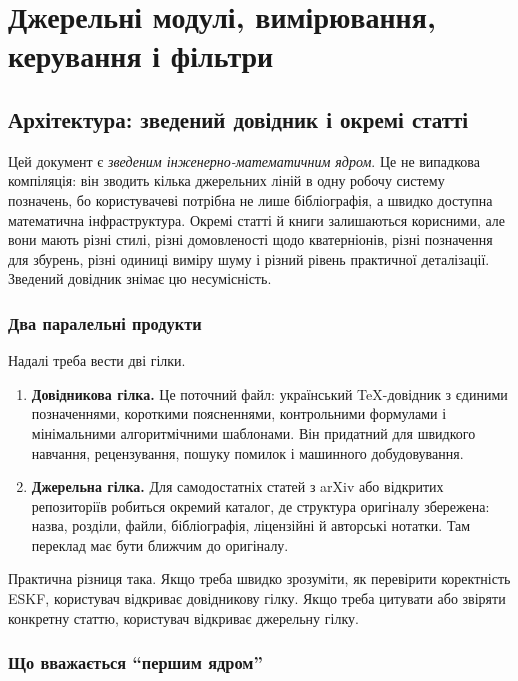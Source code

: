 
\part{Джерельні модулі, вимірювання, керування і фільтри}

\chapter{Архітектура: зведений довідник і окремі статті}

Цей документ є \emph{зведеним інженерно-математичним ядром}. Це не випадкова компіляція: він зводить кілька джерельних ліній в одну робочу систему позначень, бо користувачеві потрібна не лише бібліографія, а швидко доступна математична інфраструктура. Окремі статті й книги залишаються корисними, але вони мають різні стилі, різні домовленості щодо кватерніонів, різні позначення для збурень, різні одиниці виміру шуму і різний рівень практичної деталізації. Зведений довідник знімає цю несумісність.

\section{Два паралельні продукти}

Надалі треба вести дві гілки.

\begin{enumerate}
\item \textbf{Довідникова гілка.} Це поточний файл: український TeX-довідник з єдиними позначеннями, короткими поясненнями, контрольними формулами і мінімальними алгоритмічними шаблонами. Він придатний для швидкого навчання, рецензування, пошуку помилок і машинного добудовування.
\item \textbf{Джерельна гілка.} Для самодостатніх статей з arXiv або відкритих репозиторіїв робиться окремий каталог, де структура оригіналу збережена: назва, розділи, файли, бібліографія, ліцензійні й авторські нотатки. Там переклад має бути ближчим до оригіналу.
\end{enumerate}

Практична різниця така. Якщо треба швидко зрозуміти, як перевірити коректність ESKF, користувач відкриває довідникову гілку. Якщо треба цитувати або звіряти конкретну статтю, користувач відкриває джерельну гілку.

\section{Що вважається ``першим ядром''}

